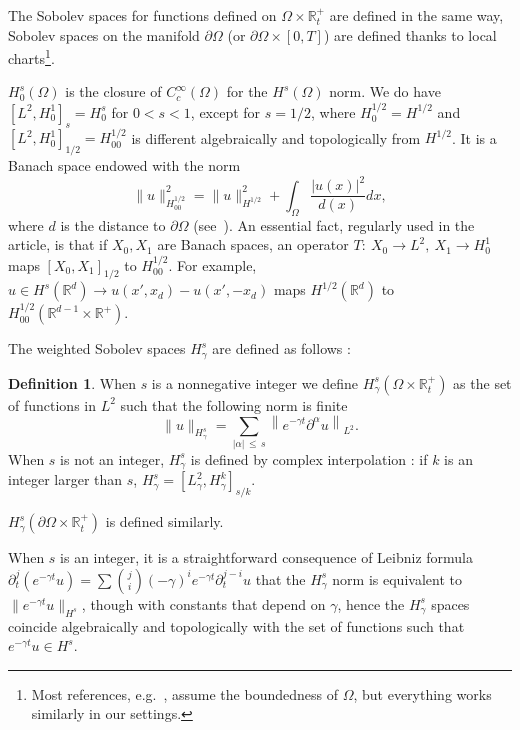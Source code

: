 \documentclass[10pt]{amsart}
\theoremstyle{definition}\newtheorem{defi}[theo]{Definition}\newtheorem{rema}[theo]{Remark}\newtheorem{exam}[theo]{Example}\newtheorem{exem}[theo]{Example}\newtheorem{nota}[theo]{Notation}
\newcommand{\R}{\mathbb{R}}
\begin{document}
The Sobolev spaces for functions defined on $\Omega\times \R_t^+$ are defined in the same way, Sobolev spaces on the manifold $\partial\Omega$ (or $\partial\Omega\times [0,T]$) are defined thanks to local charts\footnote{Most references, e.g.~\cite[Chapter~1]{lionsmagenes}, assume the boundedness of $\Omega$, but everything works similarly in our settings.}.


$H^s_0(\Omega)$ is the closure of $C_c^\infty(\Omega)$ for the $H^s(\Omega)$ norm. We do have $[L^2,H^1_0]_s=H^s_0$ for $0<s<1$, except for $s=1/2$, where $H^{1/2}_{0}=H^{1/2}$ and $[L^2,H^1_0]_{1/2}=H^{1/2}_{00}$ is different algebraically and topologically from $H^{1/2}$. It is a Banach space endowed with the norm
\[
\|u\|_{H^{1/2}_{00}}^2=
\|u\|_{H^{1/2}}^2+\int_{\Omega}
\frac{|u(x)|^2}{d(x)}dx,
\]
where $d$ is the distance to $\partial\Omega$ (see~\cite{lionsmagenes}). An essential fact, regularly used in the article, is that if $X_0,X_1$ are Banach spaces, an operator $T:\ X_0\to L^2,\ X_1\to H^1_0$ maps $[X_0,X_1]_{1/2}$ to $H^{1/2}_{00}$. For example, $u\in H^s(\R^d)\to u(x',x_d)-u(x',-x_d)$ maps $H^{1/2}(\R^d)$ to $H^{1/2}_{00}(\R^{d-1}\times \R^+)$.


The weighted Sobolev spaces $H^s_\gamma$ are defined as follows :
\begin{defi}
When $s$ is a nonnegative integer we define $H^s_\gamma(\Omega\times \R_t^+)$ as the set of functions in $L^2$ such that the following norm is finite
\[
\|u\|_{H^s_\gamma}=\sum_{|\alpha|\,\leq\,s}
\left\|e^{-\gamma t}\partial^\alpha u\right\|_{L^2}.
\]
When $s$ is not an integer, $H^s_\gamma$ is defined by complex interpolation : if $k$ is an integer larger than $s$, $H^s_\gamma=[L^2_\gamma,H^k_\gamma]_{s/k}$.


$H^s_\gamma(\partial\Omega\times \R_t^+)$ is defined similarly.
\end{defi}

When $s$ is an integer, it is a straightforward consequence of Leibniz formula $\partial_t^j(e^{-\gamma t}u)=\sum \binom{j}{i} (-\gamma)^ie^{-\gamma t}\partial_t^{j-i}u$ that the $H^s_\gamma$ norm is equivalent to $\|e^{-\gamma t}u\|_{H^s}$, though with constants that depend on $\gamma$, hence the $H^s_\gamma$ spaces coincide algebraically and topologically with the set of functions such that $e^{-\gamma t}u\in H^s$.
\end{document}

